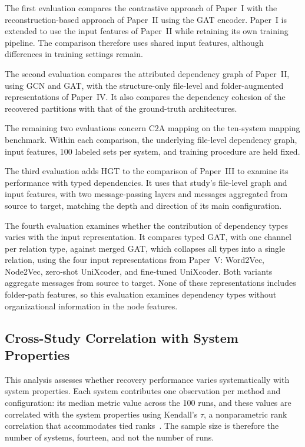 The first evaluation compares the contrastive approach of Paper~I with the reconstruction-based approach of Paper~II using the GAT encoder. Paper~I is extended to use the input features of Paper~II while retaining its own training pipeline. The comparison therefore uses shared input features, although differences in training settings remain.
 
The second evaluation compares the attributed dependency graph of Paper~II, using GCN and GAT, with the structure-only file-level and folder-augmented representations of Paper~IV. It also compares the dependency cohesion of the recovered partitions with that of the ground-truth architectures.
 
The remaining two evaluations concern C2A mapping on the ten-system mapping benchmark. Within each comparison, the underlying file-level dependency graph, input features, 100 labeled sets per system, and training procedure are held fixed.
 
The third evaluation adds HGT to the comparison of Paper~III to examine its performance with typed dependencies. It uses that study's file-level graph and input features, with two message-passing layers and messages aggregated from source to target, matching the depth and direction of its main configuration.
 
The fourth evaluation examines whether the contribution of dependency types varies with the input representation. It compares typed GAT, with one channel per relation type, against merged GAT, which collapses all types into a single relation, using the four input representations from Paper~V: Word2Vec, Node2Vec, zero-shot UniXcoder, and fine-tuned UniXcoder. Both variants aggregate messages from source to target. None of these representations includes folder-path features, so this evaluation examines dependency types without organizational information in the node features.

\subsection{Cross-Study Correlation with System Properties \label{sec:system_properties_corr}}
This analysis assesses whether recovery performance varies systematically with system properties. Each system contributes one observation per method and configuration: its median metric value across the 100 runs, and these values are correlated with the system properties using Kendall's $\tau$, a nonparametric rank correlation that accommodates tied ranks~\cite{kendall}. The sample size is therefore the number of systems, fourteen, and not the number of runs.
 
